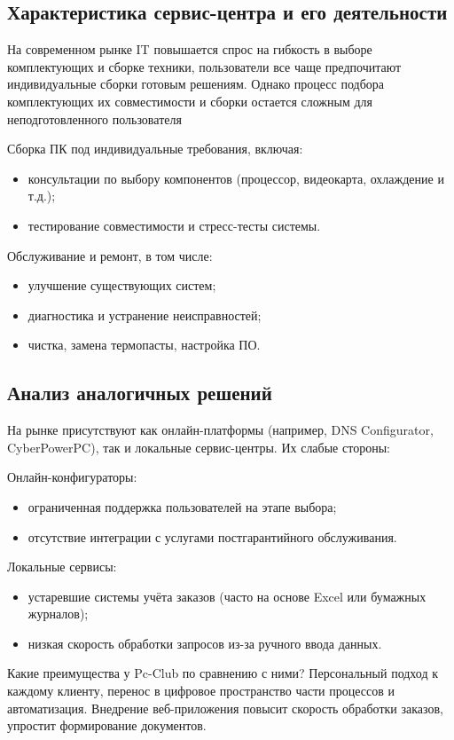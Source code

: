 \subsection{Характеристика сервис-центра и его деятельности}
На современном рынке IT повышается спрос на гибкость в выборе комплектующих и сборке техники, пользователи все чаще предпочитают индивидуальные сборки готовым решениям. Однако процесс подбора комплектующих их совместимости и сборки остается сложным для неподготовленного пользователя

Сборка ПК под индивидуальные требования, включая:
\begin{itemize}
	\item консультации по выбору компонентов (процессор, видеокарта, охлаждение и т.д.);
	\item тестирование совместимости и стресс-тесты системы.
\end{itemize}

Обслуживание и ремонт, в том числе:
\begin{itemize}
	\item улучшение существующих систем;
	\item диагностика и устранение неисправностей;
	\item чистка, замена термопасты, настройка ПО.
\end{itemize}

\subsection{Анализ аналогичных решений}
На рынке присутствуют как онлайн-платформы (например, DNS Configurator, CyberPowerPC), так и локальные сервис-центры. Их слабые стороны:

Онлайн-конфигураторы:
\begin{itemize}
	\item ограниченная поддержка пользователей на этапе выбора;
	\item отсутствие интеграции с услугами постгарантийного обслуживания.
\end{itemize}

Локальные сервисы:
\begin{itemize}
	\item устаревшие системы учёта заказов (часто на основе Excel или бумажных журналов);
	\item низкая скорость обработки запросов из-за ручного ввода данных.
\end{itemize}

Какие преимущества у Pc-Club по сравнению с ними? Персональный подход к каждому клиенту, перенос в цифровое пространство части процессов и автоматизация. Внедрение веб-приложения повысит скорость обработки заказов, упростит формирование документов. 


